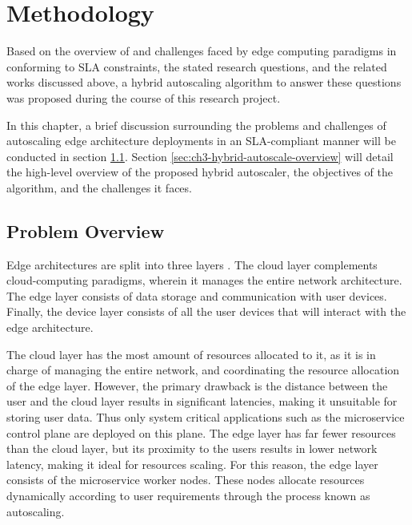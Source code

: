 \clearpage

\def\chaptertitle{Methodology}

\lhead{\emph{\chaptertitle}}

\chapter{\chaptertitle}
\label{ch:methodology}

Based on the overview of and challenges faced by edge computing paradigms in conforming to SLA constraints, the stated research questions, and the related works discussed above, a hybrid autoscaling algorithm to answer these questions was proposed during the course of this research project.\par

In this chapter, a brief discussion surrounding the problems and challenges of autoscaling edge architecture deployments in an SLA-compliant manner will be conducted in section \ref{sec:ch3-problem-overview}. Section \ref{sec:ch3-hybrid-autoscale-overview} will detail the high-level overview of the proposed hybrid autoscaler, the objectives of the algorithm, and the challenges it faces.

\section{Problem Overview}
\label{sec:ch3-problem-overview}

Edge architectures are split into three layers \cite{hamdan2020edge}. 
The cloud layer complements cloud-computing paradigms, wherein it manages the entire network architecture. The edge layer consists of data storage and communication with user devices. Finally, the device layer consists of all the user devices that will interact with the edge architecture.\par

The cloud layer has the most amount of resources allocated to it, as it is in charge of managing the entire network, and coordinating the resource allocation of the edge layer. However, the primary drawback is the distance between the user and the cloud layer results in significant latencies, making it unsuitable for storing user data. Thus only system critical applications such as the microservice control plane are deployed on this plane. The edge layer has far fewer resources than the cloud layer, but its proximity to the users results in lower network latency, making it ideal for resources scaling. For this reason, the edge layer consists of the microservice worker nodes. These nodes allocate resources dynamically according to user requirements through the process known as autoscaling.\par

